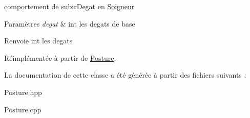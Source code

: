 comportement de subir\-Degat en \hyperlink{classSoigneur}{Soigneur} 


\begin{DoxyParams}{Paramètres}
{\em degat} & int les degats de base \\
\hline
\end{DoxyParams}
\begin{DoxyReturn}{Renvoie}
int les degats 
\end{DoxyReturn}


Réimplémentée à partir de \hyperlink{classPosture_a6c63571b8221847cf0abb1dce0ae1c5f}{Posture}.



La documentation de cette classe a été générée à partir des fichiers suivants \-:\begin{DoxyCompactItemize}
\item 
Posture.\-hpp\item 
Posture.\-cpp\end{DoxyCompactItemize}
